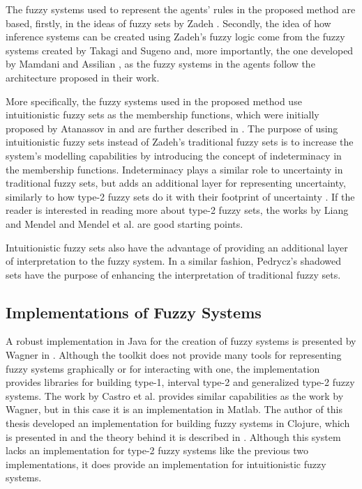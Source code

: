 The fuzzy systems used to represent the agents' rules in the proposed method are
based, firstly, in the ideas of fuzzy sets by Zadeh \cite{Zadeh1965}. Secondly,
the idea of how inference systems can be created using Zadeh's fuzzy logic come
from the fuzzy systems created by Takagi and Sugeno \cite{Takagi1985} and, more
importantly, the one developed by Mamdani and Assilian \cite{Mamdani1975}, as
the fuzzy systems in the agents follow the architecture proposed in their work.

More specifically, the fuzzy systems used in the proposed method use
intuitionistic fuzzy sets as the membership functions, which were initially
proposed by Atanassov in \cite{Atanassov1986} and are further described in
\cite{Atanassov2003}. The purpose of using intuitionistic fuzzy sets instead of
Zadeh's traditional fuzzy sets is to increase the system's modelling
capabilities by introducing the concept of indeterminacy in the membership
functions. Indeterminacy plays a similar role to uncertainty in traditional
fuzzy sets, but adds an additional layer for representing uncertainty, similarly
to how type-2 fuzzy sets do it with their footprint of uncertainty
\cite{Mendel2002} \cite{Karnik2001}. If the reader is interested in reading more
about type-2 fuzzy sets, the works by Liang and Mendel \cite{Liang2000} and
Mendel et al. \cite{Mendel2006} are good starting points.

Intuitionistic fuzzy sets also have the advantage of providing an additional
layer of interpretation to the fuzzy system. In a similar fashion, Pedrycz's
shadowed sets \cite{Pedrycz1998} have the purpose of enhancing the
interpretation of traditional fuzzy sets.

\subsection{Implementations of Fuzzy Systems}
\label{section:implementations-of-fuzzy-systems}

A robust implementation in Java for the creation of fuzzy systems is presented
by Wagner in \cite{Wagner2013}. Although the toolkit does not provide many tools
for representing fuzzy systems graphically or for interacting with one, the
implementation provides libraries for building type-1, interval type-2 and
generalized type-2 fuzzy systems. The work by Castro et
al. \cite{castro2007interval} provides similar capabilities as the work by
Wagner, but in this case it is an implementation in Matlab. The author of this
thesis developed an implementation for building fuzzy systems in Clojure, which
is presented in \cite{Hernandez-Aguila2017} and the theory behind it is
described in \cite{Hernandez-aguila2016}. Although this system lacks an
implementation for type-2 fuzzy systems like the previous two implementations,
it does provide an implementation for intuitionistic fuzzy systems.

